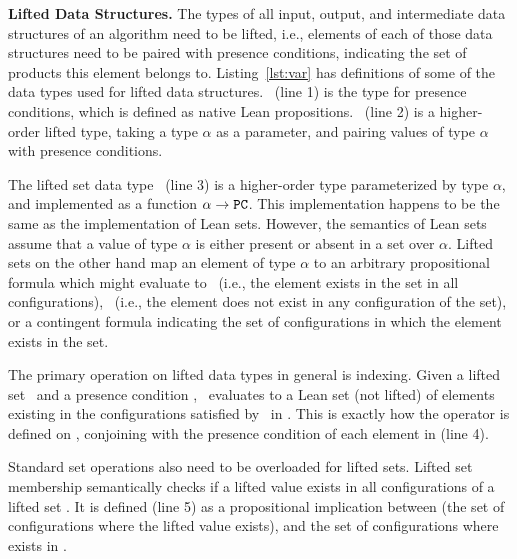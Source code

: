 

\vspace{0.1in}
\noindent
{\bf Lifted Data Structures.}
\label{sec:lifted_data}
The types of all input, output, and intermediate data structures of an algorithm need to be lifted, i.e., elements of each of those data structures need to be paired with presence conditions, indicating the set of products this element belongs to. Listing~\ref{lst:var} has definitions of some of the data types used for lifted data structures. \tPC~(line 1) is the type for presence conditions, which is defined as native Lean propositions. \Var~(line 2) is a higher-order lifted type, taking a type $\alpha$ as a parameter, and pairing values of type $\alpha$ with presence conditions. 

The lifted set data type \lset~(line 3) is a higher-order type parameterized by type $\alpha$, and implemented as a function $\alpha \to \texttt{PC}$. This implementation happens to be the same as the implementation of Lean sets. However, the semantics of Lean sets assume that a value of type $\alpha$ is either present or absent in a set over $\alpha$. Lifted sets on the other hand map an element of type $\alpha$ to an arbitrary propositional formula which might evaluate to \TT~(i.e., the element exists in the set in all configurations), \FF~(i.e., the element does not exist in any configuration of the set), or a contingent formula indicating the set of configurations in which the element exists in the set.

The primary operation on lifted data types in general is indexing. Given a lifted set ~and a presence condition , ~evaluates to a Lean set (not lifted) of elements existing in the configurations satisfied by ~in . This is exactly how the  operator is defined on \lset, conjoining  with the presence condition of each element in  (line 4).

Standard set operations also need to be overloaded for lifted sets. Lifted set membership semantically checks if a lifted value  exists in all configurations of a lifted set . It is defined (line 5) as a propositional implication between  (the set of configurations where the lifted value exists), and the set of configurations where  exists in .


